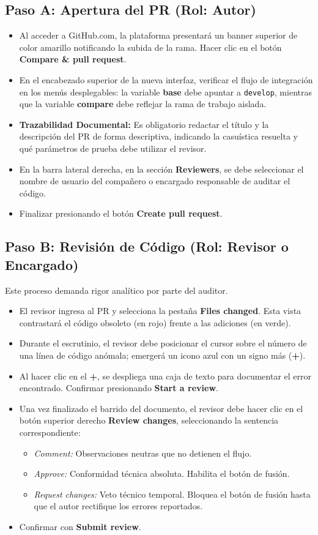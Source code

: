 \documentclass[12pt, a4paper]{article}
\begin{document}
\subsection{Paso A: Apertura del PR (Rol: Autor)}
\begin{itemize}
    \item Al acceder a GitHub.com, la plataforma presentará un banner superior de color amarillo notificando la subida de la rama. Hacer clic en el botón \textbf{Compare \& pull request}.
    \item En el encabezado superior de la nueva interfaz, verificar el flujo de integración en los menús desplegables: la variable \textbf{base} debe apuntar a \texttt{develop}, mientras que la variable \textbf{compare} debe reflejar la rama de trabajo aislada.
    \item \textbf{Trazabilidad Documental:} Es obligatorio redactar el título y la descripción del PR de forma descriptiva, indicando la casuística resuelta y qué parámetros de prueba debe utilizar el revisor.
    \item En la barra lateral derecha, en la sección \textbf{Reviewers}, se debe seleccionar el nombre de usuario del compañero o encargado responsable de auditar el código.
    \item Finalizar presionando el botón \textbf{Create pull request}.
\end{itemize}

\subsection{Paso B: Revisión de Código (Rol: Revisor o Encargado)}
Este proceso demanda rigor analítico por parte del auditor.
\begin{itemize}
    \item El revisor ingresa al PR y selecciona la pestaña \textbf{Files changed}. Esta vista contrastará el código obsoleto (en rojo) frente a las adiciones (en verde).
    \item Durante el escrutinio, el revisor debe posicionar el cursor sobre el número de una línea de código anómala; emergerá un icono azul con un signo más (\textbf{+}).
    \item Al hacer clic en el \textbf{+}, se despliega una caja de texto para documentar el error encontrado. Confirmar presionando \textbf{Start a review}.
    \item Una vez finalizado el barrido del documento, el revisor debe hacer clic en el botón superior derecho \textbf{Review changes}, seleccionando la sentencia correspondiente:
    \begin{itemize}
        \item \textit{Comment:} Observaciones neutras que no detienen el flujo.
        \item \textit{Approve:} Conformidad técnica absoluta. Habilita el botón de fusión.
        \item \textit{Request changes:} Veto técnico temporal. Bloquea el botón de fusión hasta que el autor rectifique los errores reportados.
    \end{itemize}
    \item Confirmar con \textbf{Submit review}.
\end{itemize}
\end{document}
